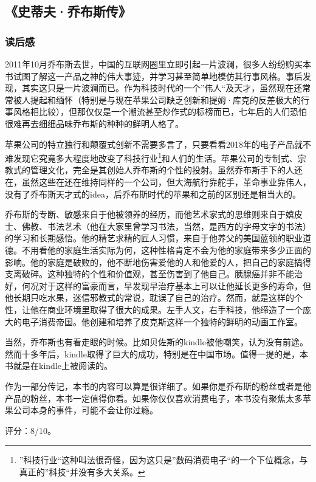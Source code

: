 \subsection{《史蒂夫·乔布斯传》}

\subsubsection{读后感}
2011年10月乔布斯去世，中国的互联网圈里立即引起一片波澜，很多人纷纷购买本书试图了解这一产品之神的伟大事迹，并学习甚至简单地模仿其行事风格。事后发现，其实这只是一片波澜而已。作为科技时代的一个”伟人“及天才，虽然现在还常常被人提起和缅怀（特别是与现在苹果公司缺乏创新和提姆·库克的反差极大的行事风格相比较），但那仅仅是一个潮流甚至炒作式的标榜而已，七年后的人们恐怕很难再去细细品味乔布斯的种种的鲜明人格了。

苹果公司的特立独行和颠覆式创新不需要多言了，只要看看2018年的电子产品就不难发现它究竟多大程度地改变了科技行业\footnote{”科技行业“这种叫法很奇怪，因为这只是”数码消费电子“的一个下位概念，与真正的”科技“并没有多大关系。}和人们的生活。苹果公司的专制式、宗教式的管理文化，完全是其创始人乔布斯的个性的投射。虽然乔布斯手下的人还在，虽然这些在还在维持同样的一个公司，但大海航行靠舵手，革命事业靠伟人，没有了乔布斯天才式的idea，后乔布斯时代的苹果和之前的区别还是相当大的。

乔布斯的专断、敏感来自于他被领养的经历，而他艺术家式的思维则来自于嬉皮士、佛教、书法艺术（他在大家里曾学习书法，当然，是西方的字母文字的书法）的学习和长期感悟。他的精艺求精的匠人习惯，来自于他养父的美国蓝领的职业道德。不用看他的家庭生活实际为何，这种性格肯定不会为他的家庭带来多少正面的影响。他的家庭是破败的，他不断地伤害爱他的人和他爱的人，把自己的家庭搞得支离破碎。这种独特的个性和价值观，甚至伤害到了他自己。胰腺癌并非不能治好，何况对于这样的富豪而言，早发现早治疗基本上可以让他延长更多的寿命，但他长期只吃水果，迷信邪教式的常说，耽误了自己的治疗。然而，就是这样的个性，让他在商业环境里取得了很大的成果。左手人文，右手科技，他缔造了一个庞大的电子消费帝国。他创建和培养了皮克斯这样一个独特的鲜明的动画工作室。

当然，乔布斯也有看走眼的时候。比如贝佐斯的kindle被他嘲笑，认为没有前途。然而十多年后，kindle取得了巨大的成功，特别是在中国市场。值得一提的是，本书就是在kindle上被阅读的。

作为一部分传记，本书的内容可以算是很详细了。如果你是乔布斯的粉丝或者是他产品的粉丝，本书一定值得你看。如果你仅仅喜欢消费电子，本书没有聚焦太多苹果公司本身的事件，可能不会让你过瘾。

评分：8/10。

